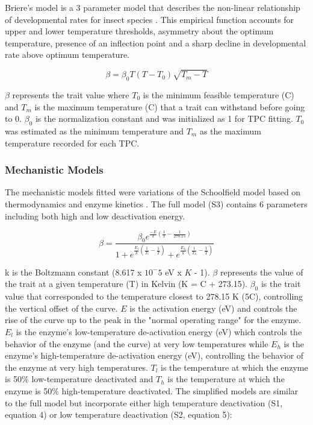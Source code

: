 \documentclass[11pt]{article}
\begin{document}
\begin{linenumbers}
Briere's model is a 3 parameter model that describes the non-linear relationship of developmental rates for insect species \cite{10.1093/ee/28.1.22}. This empirical function accounts for upper and lower temperature thresholds, asymmetry about the optimum temperature, presence of an inflection point and a sharp decline in developmental rate above optimum temperature. 

\begin{equation}
\beta = \beta_0 T (T-T_0) \sqrt{T_m-T}\tag{2}
\end{equation}

\(\beta\) represents the trait value where \(T_0\) is the minimum feasible temperature (\degree C) and \(T_m\) is the maximum temperature (\degree C) that a trait can withstand before going to 0. \(\beta_0\) is the normalization constant and was initialized as 1 for TPC fitting. \(T_0\) was estimated as the minimum temperature and \(T_m\) as the maximum temperature recorded for each TPC.

\subsubsection{Mechanistic Models}
The mechanistic models fitted were variations of the Schoolfield model based on thermodynamics and enzyme kinetics \cite{Schoolfield1981}. The full model (S3) contains 6 parameters including both high and low deactivation energy.

\begin{equation}
\beta = \frac{\beta_0 e^{\frac{-E}{k} (\frac{1}{T} - \frac{1}{278.15})}}
{ 1 + e^{\frac{E_l}{k} (\frac{1}{T_l} - \frac{1}{T})} + 
	e^{\frac{E_h}{k} (\frac{1}{T_h} - \frac{1}{T})}}\tag{3}
\end{equation}
\vspace{0.02 cm}

k is the Boltzmann constant (8.617 x $10^-5$ eV x \(K\) - 1).  \(\beta\) represents the value of the trait at a given temperature (T) in Kelvin (K = \degree C + 273.15). \(\beta_0\) is the trait value that corresponded to the temperature closest to 278.15 K (5\degree C), controlling the vertical offset of the curve. \(E\) is  the activation energy (eV) and controls the rise of the curve up to the peak in the "normal operating range" for the enzyme. \(E_l\) is the enzyme's low-temperature de-activation energy (eV) which controls the behavior of the enzyme (and the curve) at very low temperatures while \(E_h\) is the enzyme's high-temperature de-activation energy (eV), controlling the behavior of the enzyme at very high temperatures. \(T_l\) is the temperature at which the enzyme is 50\% low-temperature deactivated and \(T_h\)  is the temperature at which the enzyme is 50\% high-temperature deactivated. The simplified models are similar to the full model but incorporate either high temperature deactivation (S1, equation 4) or low temperature deactivation (S2, equation 5):


\end{linenumbers}
\end{document}
